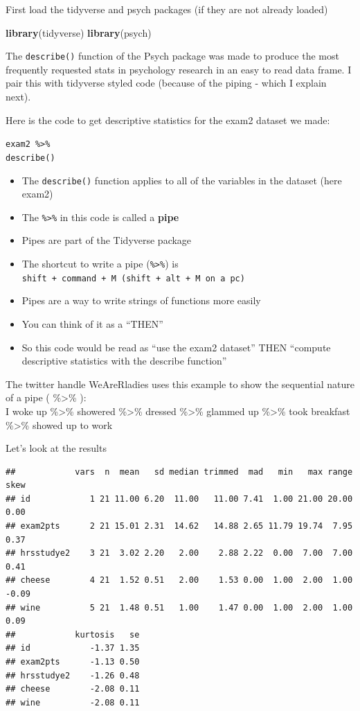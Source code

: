 \documentclass[
]{book}
\newenvironment{Shaded}{\begin{snugshade}}{\end{snugshade}}
\newcommand{\KeywordTok}[1]{\textcolor[rgb]{0.13,0.29,0.53}{\textbf{#1}}}
\newcommand{\NormalTok}[1]{#1}
\providecommand{\tightlist}{%
  \setlength{\itemsep}{0pt}\setlength{\parskip}{0pt}}
\begin{document}
First load the tidyverse and psych packages (if they are not already loaded)

\begin{Shaded}
\begin{Highlighting}[]
\KeywordTok{library}\NormalTok{(tidyverse)}
\KeywordTok{library}\NormalTok{(psych)}
\end{Highlighting}
\end{Shaded}

The \texttt{describe()} function of the Psych package was made to produce the most frequently requested stats in psychology research in an easy to read data frame. I pair this with tidyverse styled code (because of the piping - which I explain next).

Here is the code to get descriptive statistics for the exam2 dataset we made:

\texttt{exam2\ \%\textgreater{}\%}\\
\texttt{describe()}

\begin{itemize}
\tightlist
\item
  The \texttt{describe()} function applies to all of the variables in the dataset (here exam2)
\item
  The \texttt{\%\textgreater{}\%} in this code is called a \textbf{pipe}
\item
  Pipes are part of the Tidyverse package
\item
  The shortcut to write a pipe (\texttt{\%\textgreater{}\%}) is \texttt{shift\ +\ command\ +\ M\ (shift\ +\ alt\ +\ M\ on\ a\ pc)}
\item
  Pipes are a way to write strings of functions more easily
\item
  You can think of it as a ``THEN''
\item
  So this code would be read as ``use the exam2 dataset'' THEN ``compute descriptive statistics with the describe function''
\end{itemize}

The twitter handle WeAreRladies uses this example to show the sequential nature of a pipe ( \%\textgreater\% ):\\
I woke up \%\textgreater\% showered \%\textgreater\% dressed \%\textgreater\% glammed up \%\textgreater\% took breakfast \%\textgreater\% showed up to work

Let's look at the results

\begin{verbatim}
##            vars  n  mean   sd median trimmed  mad   min   max range  skew
## id            1 21 11.00 6.20  11.00   11.00 7.41  1.00 21.00 20.00  0.00
## exam2pts      2 21 15.01 2.31  14.62   14.88 2.65 11.79 19.74  7.95  0.37
## hrsstudye2    3 21  3.02 2.20   2.00    2.88 2.22  0.00  7.00  7.00  0.41
## cheese        4 21  1.52 0.51   2.00    1.53 0.00  1.00  2.00  1.00 -0.09
## wine          5 21  1.48 0.51   1.00    1.47 0.00  1.00  2.00  1.00  0.09
##            kurtosis   se
## id            -1.37 1.35
## exam2pts      -1.13 0.50
## hrsstudye2    -1.26 0.48
## cheese        -2.08 0.11
## wine          -2.08 0.11
\end{verbatim}
\end{document}

